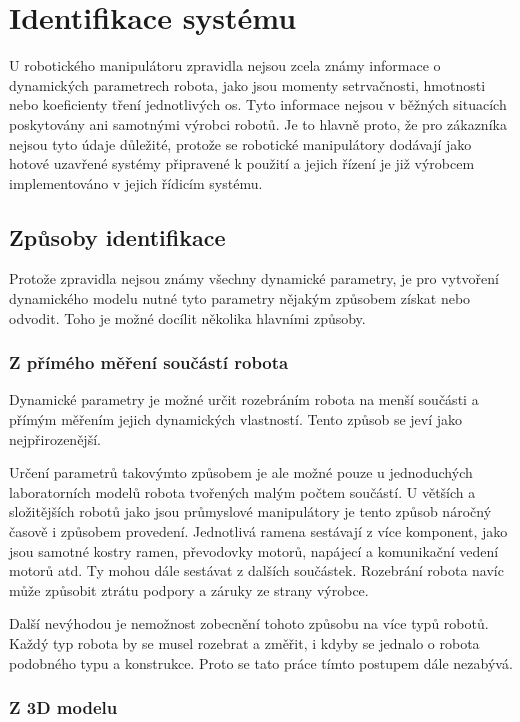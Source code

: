 

\chapter{Identifikace systému}

U robotického manipulátoru zpravidla nejsou zcela známy informace o dynamických parametrech robota, jako jsou momenty setrvačnosti, hmotnosti nebo koeficienty tření jednotlivých os. Tyto informace nejsou v běžných situacích poskytovány ani samotnými výrobci robotů. Je to hlavně proto, že pro zákazníka nejsou tyto údaje důležité, protože se robotické manipulátory dodávají jako hotové uzavřené systémy připravené k použití a jejich řízení je již výrobcem implementováno v jejich řídicím systému.

\section{Způsoby identifikace}

Protože zpravidla nejsou známy všechny dynamické parametry, je pro vytvoření dynamického modelu nutné tyto parametry nějakým způsobem získat nebo odvodit. Toho je možné docílit několika hlavními způsoby.

\subsection{Z přímého měření součástí robota}

Dynamické parametry je možné určit rozebráním robota na menší součásti a přímým měřením jejich dynamických vlastností. Tento způsob se jeví jako nejpřirozenější.

Určení parametrů takovýmto způsobem je ale možné pouze u jednoduchých laboratorních modelů robota tvořených malým počtem součástí. U větších a složitějších robotů jako jsou průmyslové manipulátory je tento způsob náročný časově i způsobem provedení. Jednotlivá ramena sestávají z více komponent, jako jsou samotné kostry ramen, převodovky motorů, napájecí a komunikační vedení motorů atd. Ty mohou dále sestávat z dalších součástek. Rozebrání robota navíc může způsobit ztrátu podpory a záruky ze strany výrobce.

Další nevýhodou je nemožnost zobecnění tohoto způsobu na více typů robotů. Každý typ robota by se musel rozebrat a změřit, i kdyby se jednalo o robota podobného typu a konstrukce. Proto se tato práce tímto postupem dále nezabývá.    

\subsection{Z 3D modelu}

